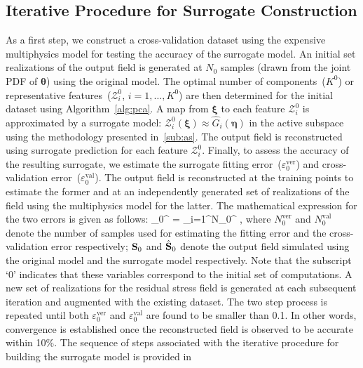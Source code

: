 \subsection{Iterative Procedure for Surrogate Construction}
\label{sub:pcas}

As a first step, we construct a cross-validation dataset using the expensive multiphysics model
 for testing the accuracy of the surrogate model. 
An initial set realizations of the output field is generated at $N_0$ samples 
(drawn from the joint PDF of $\bm{\theta}$) using the original model. 
The optimal number of components~($K^0$) or representative features~($\mathcal{Z}_i^0$, $i=1,\ldots,K^0$)
are then determined for
the initial dataset using Algorithm~\ref{alg:pca}. A map from $\bm{\xi}$ to each feature $\mathcal{Z}_i^0$
is approximated by a surrogate model: $\mathcal{Z}_i^0(\bm{\xi})\approx 
\hat{G}_i(\bm{\eta})$ in the active subspace using
the methodology presented in~\ref{sub:as}. The output field is reconstructed using surrogate 
prediction for each feature $\mathcal{Z}_i^0$. Finally, to assess the accuracy of the resulting 
surrogate, we estimate the surrogate fitting error~($\varepsilon_0^{\text{ver}}$)
and cross-validation error~($\varepsilon_0^{\text{val}}$). The output field is reconstructed at 
the training points to estimate the former and at an independently generated set of realizations of the
field using the multiphysics model for the latter. 
The mathematical expression for the two errors is given as
follows:
%
\be
\varepsilon_0^{} = 
\sum\limits_{i=1}^{N_0^{}} ,
\label{eq:check}
\ee
%
where $N_0^{\text{ver}}$ and $N_0^{\text{val}}$ denote the number of samples used for estimating the fitting error and the
cross-validation error
respectively; $\mathbf{{S}}_0$ and $\hat{\mathbf{{S}}}_0$ denote the output field simulated using the original model and the 
surrogate model respectively. Note that the subscript `0' indicates that these variables correspond to the initial set
of computations. 
A new set of realizations for the residual stress field is generated at each subsequent iteration
and augmented with the existing dataset. The two step process is repeated until both $\varepsilon_0^{\text{ver}}$
and $\varepsilon_0^{\text{val}}$ are found to be smaller than 0.1. In other words, convergence is established 
once the reconstructed field is observed to be accurate within 10$\%$. 
The sequence of steps associated with the iterative procedure for building the surrogate model is provided in
